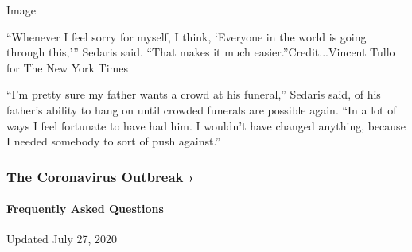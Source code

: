 Image

``Whenever I feel sorry for myself, I think, `Everyone in the world is
going through this,''' Sedaris said. ``That makes it much
easier.''Credit...Vincent Tullo for The New York Times

``I'm pretty sure my father wants a crowd at his funeral,'' Sedaris
said, of his father's ability to hang on until crowded funerals are
possible again. ``In a lot of ways I feel fortunate to have had him. I
wouldn't have changed anything, because I needed somebody to sort of
push against.''

\href{https://www.nytimes.com/news-event/coronavirus?action=click\&pgtype=Article\&state=default\&region=MAIN_CONTENT_3\&context=storylines_faq}{}

\hypertarget{the-coronavirus-outbreak-}{%
\subsubsection{The Coronavirus Outbreak
›}\label{the-coronavirus-outbreak-}}

\hypertarget{frequently-asked-questions}{%
\paragraph{Frequently Asked
Questions}\label{frequently-asked-questions}}

Updated July 27, 2020

